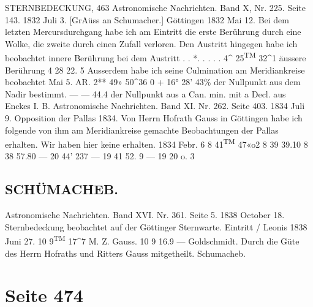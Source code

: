 \documentclass[10pt,a4paper]{article}
\begin{document}
STERNBEDECKUNG,  463
Astronomische  Nachrichten.     Band  X,  Nr.  225.  Seite  143.     1832  Juli  3.
[GrAüss  an  Schumacher.]     Göttingen  1832  Mai  12.
Bei  dem  letzten  Mercursdurchgang  habe  ich  am  Eintritt  die  erste  Berührung  durch  eine  Wolke,
die  zweite  durch  einen  Zufall  verloren.     Den  Austritt  hingegen  habe  ich  beobachtet
innere  Berührung  bei  dem  Austritt       .     .  *.     .     .\textbullet{}    .     .     4\textasciicircum{}  25\textsuperscript{TM}  32\textasciicircum{}1
äussere  Berührung
4    28     22. 5
Ausserdem  habe  ich  seine  Culmination  am  Meridiankreise  beobachtet
Mai  5.  AR.    2**  49\glqq{}»  50\textasciicircum{}36
0  +  16°  28'   43\%  der  Nullpunkt  aus  dem  Nadir  bestimmt.
---     ---     44.4  der  Nullpunkt  aus  a  Can.  min.  mit  a  Decl.  aus  Enckes  I.  B.
Astronomische  Nachrichten.     Band  XI.  Nr.  262.  Seite  403.     1834  Juli  9.
Opposition  der  Pallas  1834.
Von  Herrn  Hofrath  Gauss  in  Göttingen  habe  ich  folgende  von  ihm  am  Meridiankreise  gemachte
Beobachtungen  der  Pallas  erhalten.     Wir  haben  hier  keine  erhalten.
1834  Febr.     6
8\glqq{}  41\textsuperscript{TM}  47«o2
8  39  39.10
8     38     57.80
---  20\glqq{}  44'    23\glqq{}7
---  19     41     52. 9
---  19     20       o.  3
\subsection*{SCHÜMACHEB.}

Astronomische  Nachrichten.     Band  XVI.  Nr.  361.  Seite  5.     1838  October  18.
Sternbedeckung  beobachtet  auf  der  Göttinger  Sternwarte.
Eintritt  /  Leonis  1838  Juni  27.     10\glqq{}  9\textsuperscript{TM}  17\textasciicircum{}7  M.  Z.     Gauss.
10     9     16.9     ---        Goldschmidt.
Durch  die  Güte  des  Herrn  Hofraths  und  Ritters  Gauss  mitgetheilt. Schumacheb.

\newpage
\section*{Seite 474}
\end{document}
